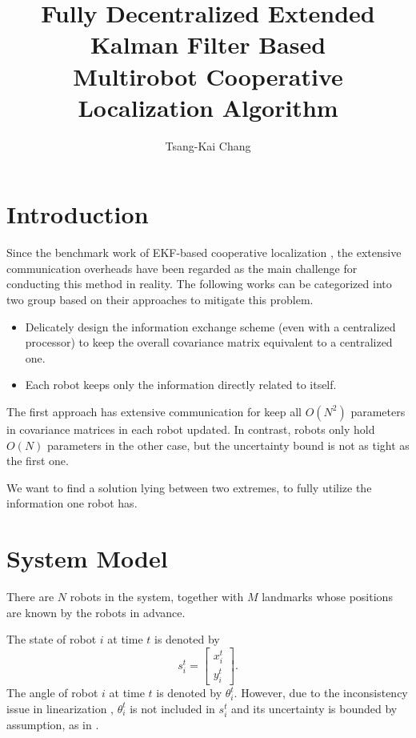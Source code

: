 \documentclass[xcolor=x11names]{article}
\title{Fully Decentralized Extended Kalman Filter Based \\Multirobot Cooperative Localization Algorithm}
\author{Tsang-Kai Chang}
\begin{document}
\maketitle


\section{Introduction}




   Since the benchmark work of EKF-based cooperative localization \cite{roumeliotis_distributed_2002}, the extensive communication overheads have been regarded as the main challenge for conducting this method in reality. The following works can be categorized into two group based on their approaches to mitigate this problem.
   \begin{itemize}
      \item Delicately design the information exchange scheme (even with a centralized processor) to keep the overall covariance matrix equivalent to a centralized one. \cite{kia_centralized-equivalent_2014, kia_cooperative_2015}
      \item Each robot keeps only the information directly related to itself. \cite{carrillo-arce_decentralized_2013, luft_recursive_2016}
   \end{itemize}
   
   The first approach has extensive communication for keep all $O(N^2)$ parameters in covariance matrices in each robot updated. In contrast, robots only hold $O(N)$ parameters in the other case, but the uncertainty bound is not as tight as the first one. 
   
   We want to find a solution lying between two extremes, to fully utilize the information one robot has.














\section{System Model}
   
   
   There are $N$ robots in the system, together with $M$ landmarks whose positions are known by the robots in advance.
   
   The state of robot $i$ at time $t$ is denoted by
   \begin{equation}
      s^{t}_{i} = 
      \begin{bmatrix} 
         x^{t}_{i} \\  y^{t}_{i}
      \end{bmatrix}.
   \end{equation}  
   The angle of robot $i$ at time $t$ is denoted by $\theta^t_i$. However, due to the inconsistency issue in linearization \cite{bailey_consistency_2006}, $\theta^t_i$ is not included in $s^t_i$ and its uncertainty is bounded by assumption, as in \cite{mourikis_performance_2006}.
   
\end{document}
